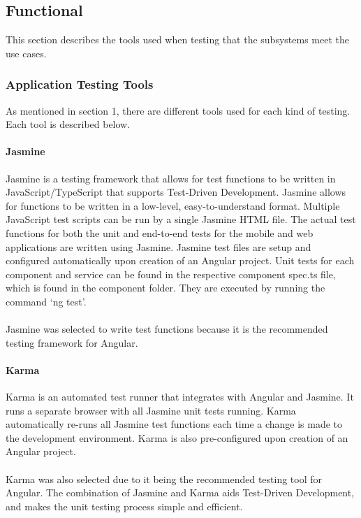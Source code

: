 \documentclass[a4paper, 11pt]{article}
\begin{document}
    \subsection{Functional}
    This section describes the tools used when testing that the subsystems meet the use cases.
    
        \subsubsection{Application Testing Tools}
        As mentioned in section 1, there are different tools used for each kind of testing. Each tool is described below.
        
            \paragraph{Jasmine}
            Jasmine is a testing framework that allows for test functions to be written in JavaScript/TypeScript that supports Test-Driven Development. Jasmine allows for functions to be written in a low-level, easy-to-understand format. Multiple JavaScript test scripts can be run by a single Jasmine HTML file. The actual test functions for both the unit and end-to-end tests for the mobile and web applications are written using Jasmine. Jasmine test files are setup and configured automatically upon creation of an Angular project. Unit tests for each component and service can be found in the respective component spec.ts file, which is found in the component folder. They are executed by running the command ‘ng test’.
            \paragraph{}
            Jasmine was selected to write test functions because it is the recommended testing framework for Angular.
            
            \paragraph{Karma}
            Karma is an automated test runner that integrates with Angular and Jasmine. It runs a separate browser with all Jasmine unit tests running. Karma automatically re-runs all Jasmine test functions each time a change is made to the development environment. Karma is also pre-configured upon creation of an Angular project.
            \paragraph{}
            Karma was also selected due to it being the recommended testing tool for Angular. The combination of Jasmine and Karma aids Test-Driven Development, and makes the unit testing process simple and efficient.
            
\end{document}
